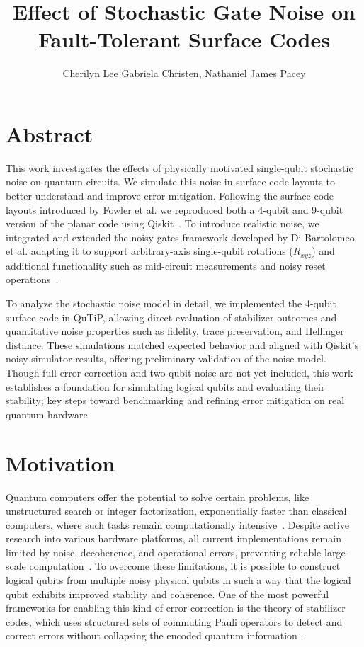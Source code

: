 \documentclass[9pt,a4paper,twocolumn,twoside]{tau-class/tau}
\title{Effect of Stochastic Gate Noise on Fault-Tolerant Surface Codes}
\author[b,2]{Cherilyn Lee Gabriela Christen, Nathaniel James Pacey}
\begin{document}
\maketitle
\section{Abstract}
This work investigates the effects of physically motivated single-qubit stochastic noise on quantum circuits. We simulate this noise in surface code layouts to better understand and improve error mitigation. Following the surface code layouts introduced by Fowler et al. we reproduced both a 4-qubit and 9-qubit version of the planar code using Qiskit~\cite{fowler2012surface}. To introduce realistic noise, we integrated and extended the noisy gates framework developed by Di Bartolomeo et al. adapting it to support arbitrary-axis single-qubit rotations (\( R_{xyz} \)) and additional functionality such as mid-circuit measurements and noisy reset operations~\cite{dibartolomeo2023noisy}.

To analyze the stochastic noise model in detail, we implemented the 4-qubit surface code in QuTiP, allowing direct evaluation of stabilizer outcomes and quantitative noise properties such as fidelity, trace preservation, and Hellinger distance. These simulations matched expected behavior and aligned with Qiskit’s noisy simulator results, offering preliminary validation of the noise model. Though full error correction and two-qubit noise are not yet included, this work establishes a foundation for simulating logical qubits and evaluating their stability; key steps toward benchmarking and refining error mitigation on real quantum hardware.


\section{Motivation}
Quantum computers offer the potential to solve certain problems, like unstructured search or integer factorization, exponentially faster than classical computers, where such tasks remain computationally intensive~\cite{ncbiQuantumOverview2019}. 
Despite active research into various hardware platforms, all current implementations remain limited by noise, decoherence, and operational errors, preventing reliable large-scale computation~\cite{ncbiQuantumOverview2019,fowler2014scalable}.
To overcome these limitations, it is possible to construct logical qubits from multiple noisy physical qubits in such a way that the logical qubit exhibits improved stability and coherence. One of the most powerful frameworks for enabling this kind of error correction is the theory of stabilizer codes, which uses structured sets of commuting Pauli operators to detect and correct errors without collapsing the encoded quantum information \cite{fowler2012surface}. 
\end{document}
